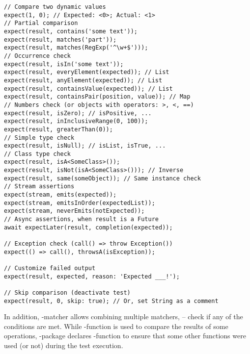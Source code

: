 \begin{lstlisting}
// Compare two dynamic values
expect(1, 0); // Expected: <0>; Actual: <1>
// Partial comparison
expect(result, contains('some text'));
expect(result, matches('part'));
expect(result, matches(RegExp('^\w+$')));
// Occurrence check
expect(result, isIn('some text'));
expect(result, everyElement(expected)); // List
expect(result, anyElement(expected)); // List
expect(result, containsValue(expected)); // List
expect(result, containsPair(position, value)); // Map
// Numbers check (or objects with operators: >, <, ==)
expect(result, isZero); // isPositive, ...
expect(result, inInclusiveRange(0, 100));
expect(result, greaterThan(0));
// Simple type check
expect(result, isNull); // isList, isTrue, ...
// Class type check
expect(result, isA<SomeClass>());
expect(result, isNot(isA<SomeClass>())); // Inverse
expect(result, same(someObject)); // Same instance check
// Stream assertions
expect(stream, emits(expected));
expect(stream, emitsInOrder(expectedList));
expect(stream, neverEmits(notExpected));
// Async assertions, when result is a Future
await expectLater(result, completion(expected));

// Exception check (call() => throw Exception())
expect(() => call(), throwsA(isException));

// Customize failed output
expect(result, expected, reason: 'Expected ___!');

// Skip comparison (deactivate test)
expect(result, 0, skip: true); // Or, set String as a comment
\end{lstlisting}

\noindent In addition, -matcher allows combining multiple matchers,  -- check if any of the conditions 
are met. While -function is used to compare the results of some operations, -package declares 
-function to ensure that some other functions were used (or not) during the test execution.

